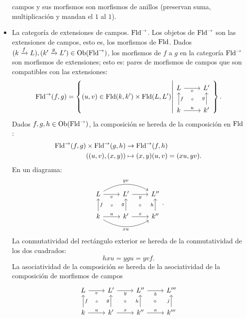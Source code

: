 \begin{example}
\begin{itemize}
        campos y sus morfismos son morfismos de anillos
        (preservan suma, multiplicación y mandan el $1$ al $1$).
        \item La categoría de extensiones de campos.
        $\mathrm{Fld}^\to$.
        Los objetos de $\mathrm{Fld}^\to$ son las
        extensiones de campos, esto es, los morfismos de $\mathrm{Fld}$.
      Dados $(k\xrightarrow{f} L),(k'\xrightarrow{g}L')\in\mathrm{Ob}(\mathrm{Fld}^\to)$,
      los morfismos de $f$ a $g$ en la categoría $\mathrm{Fld}^\to$
      son morfismos de extensiones; esto es:
      pares de morfismos de campos que son compatibles con
      las extensiones:
      \[
        \Fld^\to(f,g)
        = \left\{
          (u,v)\in \Fld(k,k')\times \Fld(L,L')
          \middle|
          \begin{tikzcd}
            L \ar[r,"v"'] & L' \\
            k \ar[u,"f"'] \ar[r,"u"] & k' \ar[u,"g"]
            \ar[equal,from=1-1,to=2-2,shorten=5mm]
          \end{tikzcd}
        \right\}
      .\]
    Dados $f,g,h\in\mathrm{Ob}(\mathrm{Fld}^\to)$, la composición se hereda de la
    composición en $\mathrm{Fld}$:
    \begin{align*}
      \mathrm{Fld}^\to(f,g)\times\mathrm{Fld}^\to(g,h) &\to \mathrm{Fld}^\to(f,h) \\
      ((u,v) , (x,y)) &\mapsto (x,y)(u,v)=(xu,yv).
    \end{align*}
    En un diagrama:
    \[
        \begin{tikzcd}
          L \ar[r,"v"'] \ar[rr,bend left,"yv"] & L' \ar[r,"y"'] & L''\\
          k \ar[u,"f"'] \ar[r,"u"] \ar[rr,bend right,"xu"']
          & k' \ar[u,"g"] \ar[r,"x"] & k''\ar[u,"h"]
          \ar[equal,from=1-1,to=2-2,shorten=5mm]
          \ar[equal,from=1-2,to=2-3,shorten=5mm]
        \end{tikzcd}
    .\]
    La conmutatividad del rectángulo exterior se hereda de la
    conmutatividad de los dos cuadrados:
      \[
          hxu = ygu = yvf
      .\]
    La asociatividad de la composición se hereda de la
    asociatividad de la composición de morfismos de campos
    \[
        \begin{tikzcd}
          L \ar[r,"v"'] & L' \ar[r,"y"'] & L'' \ar[r,"b"'] & L'''\\
          k \ar[u,"f"'] \ar[r,"u"]
          & k' \ar[u,"g"] \ar[r,"x"]
          & k''\ar[u,"h"] \ar[r,"a"]
          & k''' \ar[u,"j"]
          \ar[equal,from=1-1,to=2-2,shorten=5mm]
          \ar[equal,from=1-2,to=2-3,shorten=5mm]
          \ar[equal,from=1-3,to=2-4,shorten=5mm]
        \end{tikzcd}
\]
\end{itemize}
\end{example}
